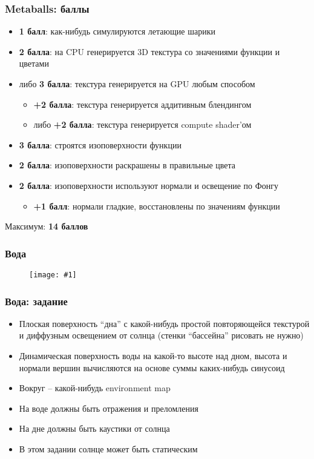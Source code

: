 \documentclass{beamer}
\newcommand{\slideimage}[1]{
  \begin{figure}
    \begin{adjustbox}{width=\textwidth, totalheight=\textheight-2\baselineskip-2\baselineskip,keepaspectratio}
      \texttt{[image: \#1]}
    \end{adjustbox}
  \end{figure}
}
\begin{document}
\begin{frame}[fragile]
\frametitle{Metaballs: баллы}
\fontsize{8pt}{8pt}
\selectfont
\begin{itemize}
\item \textbf{1 балл}: как-нибудь симулируются летающие шарики
\item \textbf{2 балла}: на CPU генерируется 3D текстура со значениями функции и цветами
\item либо \textbf{3 балла}: текстура генерируется на GPU любым способом
\begin{itemize}
\fontsize{8pt}{8pt}
\selectfont
\item \textbf{+2 балла}: текстура генерируется аддитивным блендингом
\item либо \textbf{+2 балла}: текстура генерируется compute shader'ом
\end{itemize}
\item \textbf{3 балла}: строятся изоповерхности функции
\item \textbf{2 балла}: изоповерхности раскрашены в правильные цвета
\item \textbf{2 балла}: изоповерхности используют нормали и освещение по Фонгу
\begin{itemize}
\fontsize{8pt}{8pt}
\selectfont
\item \textbf{+1 балл}: нормали гладкие, восстановлены по значениям функции
\end{itemize}
\end{itemize}
Максимум: \textbf{14 баллов}
\end{frame}

\begin{frame}
\frametitle{Вода}
\slideimage{water.jpg}
\end{frame}

\begin{frame}[fragile]
\frametitle{Вода: задание}
\fontsize{8pt}{8pt}
\selectfont
\begin{itemize}
\item Плоская поверхность ``дна'' с какой-нибудь простой повторяющейся текстурой и диффузным освещением от солнца (стенки ``бассейна'' рисовать не нужно)
\item Динамическая поверхность воды на какой-то высоте над дном, высота и нормали вершин вычисляются на основе суммы каких-нибудь синусоид
\item Вокруг -- какой-нибудь environment map
\item На воде должны быть отражения и преломления
\item На дне должны быть каустики от солнца
\item В этом задании солнце может быть статическим
\end{itemize}
\end{frame}
\end{document}
